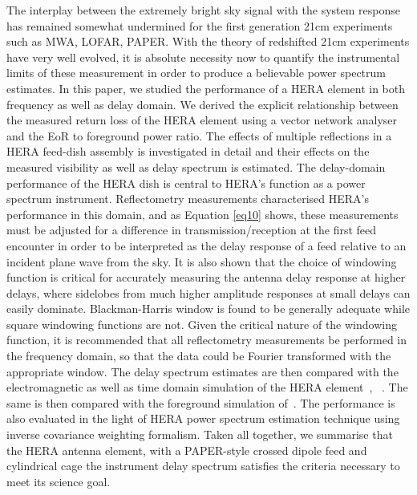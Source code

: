 \documentclass[twocolumn]{emulateapj}
\begin{document}
    The interplay between the extremely bright sky signal with the system response
    has remained somewhat undermined for the first generation 21cm experiments such
    as MWA, LOFAR, PAPER. With the theory of redshifted 21cm experiments have very
    well evolved, it is absolute necessity now to quantify the instrumental limits
    of these measurement in order to produce a believable power spectrum estimates.
    In this paper, we studied the performance of a HERA element in both frequency
    as well as delay domain. We derived the explicit relationship between the measured return loss
    of the HERA element using a vector network analyser and the EoR to foreground power ratio.
    The effects of multiple reflections  in a HERA
    feed-dish assembly is investigated in detail and their effects on the measured
    visibility as well as delay spectrum is estimated.  The delay-domain
    performance of the HERA dish is central to HERA's function as a power spectrum
    instrument. Reflectometry measurements characterised HERA's performance in this
    domain, and as Equation \ref{eq10} shows, these measurements must be adjusted
    for a difference in transmission/reception at the first feed encounter in
    order to be interpreted as the delay response of a feed relative to an incident
    plane wave from the sky.  It is also shown that the choice of windowing
    function is critical for accurately measuring the antenna delay response at
    higher delays, where sidelobes from much higher amplitude responses at small
    delays can easily dominate.  Blackman-Harris window is found to be generally
    adequate while square windowing functions are not.  Given the critical nature
    of the windowing function, it is recommended that all reflectometry
    measurements be performed in the frequency domain, so that the data could be
    Fourier transformed with the appropriate window.  The delay spectrum estimates
    are then compared with the electromagnetic as well as time domain simulation of
    the HERA element~\citep{Ewall-Wice_et_al2016}, ~\citep{ddboer_et_al2016}. The
    same is then compared with the foreground simulation
    of~\cite{Thyagarajan_et_al2015}. The performance is also evaluated in the light
    of HERA power spectrum estimation technique using inverse covariance weighting
    formalism.  Taken all together, we summarise that the HERA antenna element,
    with a PAPER-style crossed dipole feed and cylindrical cage the instrument
    delay spectrum satisfies the criteria necessary to meet its science
    goal. \\
    
\end{document}
